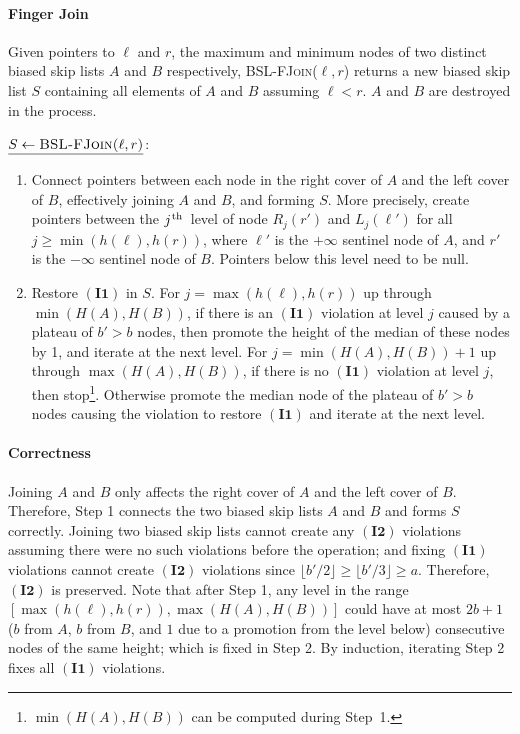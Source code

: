 \documentclass[11pt]{article}
\newcommand{\ens}[1]{\ensuremath{#1}}
\newcommand{\jth}{\ens{j^{\mbox{\hspace{.2mm}\scriptsize th}}}}
\newcommand{\Bslfjoinx}[2]{\mbox{\textsc{BSL-FJoin(\ensuremath{#1,#2})}}}
\newcommand{\invone}{\ensuremath{\mathbf{(I1)}}}
\newcommand{\invtwo}{\ensuremath{\mathbf{(I2)}}}
\newcommand{\nodeheight}[1]{\ensuremath{h(#1)}}
\newcommand{\intheight}[1]{\ensuremath{H(#1)}}
\newcommand{\node}[1]{\ensuremath{#1}}
\newcommand{\bsl}[1]{\ensuremath{#1}}
\newcommand{\lvlpre}[2]{\ensuremath{L_{#1}(#2)}}
\newcommand{\lvlsuc}[2]{\ensuremath{R_{#1}(#2)}}
\begin{document}
\paragraph{Finger Join} 
Given pointers to $\node \ell$ and $\node r$, the maximum and minimum nodes of two distinct biased skip lists $\bsl A$ and $\bsl B$ respectively, \Bslfjoinx{\ell}{r} returns a new biased skip list $\bsl S$ containing all elements of $\bsl A$ and $\bsl B$ assuming $\node \ell < \node r$. $\bsl A$ and $\bsl B$ are destroyed in the process. 


\vspace{5mm} 
\noindent $\underline{\bsl S \leftarrow \Bslfjoinx{\ell}{r}}$:
\begin{enumerate} 
\item Connect pointers between each node in the right cover of \bsl A and the left cover of \bsl B, effectively joining \bsl A and \bsl B, and forming \bsl S. 
More precisely, create pointers between the \jth\ level of node \lvlsuc{j}{r'} and \lvlpre{j}{\ell'} for all $j\geq\min(\nodeheight{\ell},\nodeheight{r})$, where $\ell'$ is the $+\infty$ sentinel node of \bsl A, and $r'$ is the $-\infty$ sentinel node of \bsl B. Pointers below this level need to be null. 

\item Restore \invone{} in \bsl S. For $j = \max(\nodeheight{\ell},\nodeheight{r})$ up through $\min(\intheight A,\intheight B)$, if there is an \invone{} violation at level $j$ caused by a plateau of $b'>b$ nodes, then promote the height of the median of these nodes by 1, and iterate at the next level. For $j = \min(\intheight{A},\intheight{B})+1$ up through $\max(\intheight A,\intheight B)$, if there is no \invone{} violation at level $j$, then stop\footnote{$\min(\intheight{A},\intheight{B})$ can be computed during Step~1.}. Otherwise promote the median node of the plateau of $b'>b$ nodes causing the violation to restore \invone{} and iterate at the next level. 
\end{enumerate} 

\paragraph{Correctness} 
Joining \bsl A and \bsl B only affects the right cover of \bsl A and the left cover of \bsl B. Therefore, Step 1 connects the two biased skip lists \bsl A and \bsl B and forms \bsl S correctly. Joining two biased skip lists cannot create any \invtwo{} violations assuming there were no such violations before the operation; and fixing \invone{} violations cannot create \invtwo{} violations since $\lfloor b'/2\rfloor \geq\lfloor b'/3\rfloor \geq a$. Therefore, \invtwo{} is preserved. Note that after Step 1, any level in the range $[\max(\nodeheight{\ell}, \nodeheight{r}),\max(\intheight{A},\intheight{B})]$ could have at most $2b+1$ ($b$ from \bsl A, $b$ from \bsl B, and $1$ due to a promotion from the level below) consecutive nodes of the same height; which is fixed in Step 2. By induction, iterating Step 2 fixes all \invone{} violations. 
\end{document}
